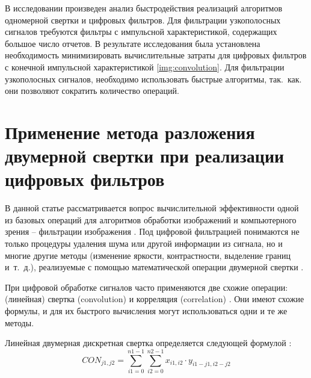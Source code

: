 В исследовании произведен анализ быстродействия реализаций алгоритмов одномерной свертки и цифровых фильтров. Для фильтрации  узкополосных сигналов требуются фильтры с импульсной характеристикой, содержащих большое число отчетов. 
В результате исследования была установлена необходимость минимизировать вычислительные затраты для цифровых фильтров с конечной импульсной характеристикой \ref{img:convolution}.
Для фильтрации  узкополосных сигналов, необходимо использовать быстрые алгоритмы, так.~как. они позволяют сократить количество операций. 


\section{Применение метода разложения двумерной свертки при реализации цифровых фильтров} \label{sec:ch3/sect4}
В данной статье рассматривается вопрос вычислительной эффективности одной из базовых операций для алгоритмов обработки изображений и компьютерного зрения – фильтрации изображения \cite{Gonzalez2012digital}.
Под цифровой фильтрацией понимаются не только процедуры удаления шума или другой информации из сигнала, но и многие другие методы (изменение яркости, контрастности, выделение границ и~т.~д.), реализуемые с помощью математической операции двумерной свертки \cite{Rabiner1978theory, bluehut1989fast}.


При цифровой обработке сигналов часто применяются две схожие операции: (линейная) свертка (convolution) и корреляция (correlation) \cite{bluehut1989fast, Lukin2002Introduction}. Они имеют схожие формулы, и для их быстрого вычисления могут использоваться одни и те же методы. 


Линейная двумерная дискретная свертка определяется следующей формулой \cite{decomposition_method_application2017}:
\begin{equation}
	\label{eq:equation3.5.1}
	CON_{j1,j2} = \sum_{i1 =0}^{n1-1} \sum_{i2 =0}^{n2-1} x_{i1,i2} \cdot y_{i1-j1,i2-j2}
\end{equation}

